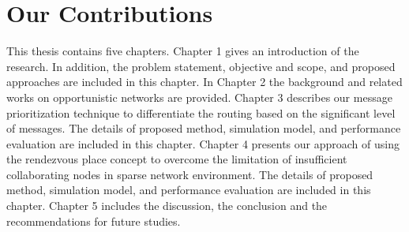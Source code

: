 \section{Our Contributions}
\label{intro:Our Contributions}
This thesis contains five chapters.
Chapter 1 gives an introduction of the research.
In addition, the problem statement, objective and scope, and proposed approaches are included in this chapter.
In Chapter 2 the background and related works on opportunistic networks are provided.
Chapter 3 describes our message prioritization technique to differentiate the routing based on the significant level of messages.
The details of proposed method, simulation model, and performance evaluation are included in this chapter.
Chapter 4 presents our approach of using the rendezvous place concept to overcome the limitation of insufficient collaborating nodes in sparse network environment.
The details of proposed method, simulation model, and performance evaluation are included in this chapter.
Chapter 5 includes the discussion, the conclusion and the recommendations for future studies.